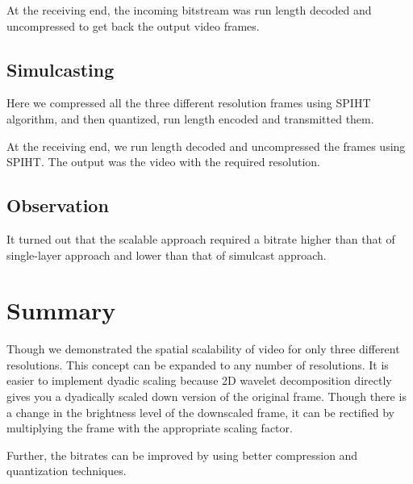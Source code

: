 \documentclass[10pt,twocolumn]{article}
\begin{document}
At the receiving end, the incoming bitstream was run length decoded and uncompressed to get back the output video frames.

\subsection*{Simulcasting}

Here we compressed all the three different resolution frames using SPIHT algorithm, and then quantized, run length encoded and transmitted them.

At the receiving end, we run length decoded and uncompressed the frames using SPIHT. The output was the video with the required resolution.

\subsection*{Observation}
It turned out that the scalable approach required a bitrate higher than that of single-layer approach and lower than that of simulcast approach.


\section{Summary}

Though we demonstrated the spatial scalability of video for only three different resolutions. This concept can be expanded to any number of resolutions. It is easier to implement dyadic scaling because 2D wavelet decomposition directly gives you a dyadically scaled down version of the original frame. Though there is a change in the brightness level of the downscaled frame, it can be rectified by multiplying the frame with the appropriate scaling factor.

Further, the bitrates can be improved by using better compression and quantization techniques.



\end{document}
